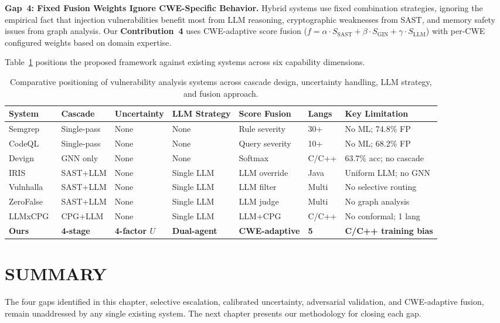 \textbf{Gap~4: Fixed Fusion Weights Ignore CWE-Specific Behavior.}
Hybrid systems use fixed combination strategies, ignoring the empirical
fact that injection vulnerabilities benefit most from LLM reasoning,
cryptographic weaknesses from SAST, and memory safety issues from graph
analysis. Our \textbf{Contribution~4} uses CWE-adaptive score fusion
($f = \alpha \cdot S_{\text{SAST}} + \beta \cdot S_{\text{GIN}} +
\gamma \cdot S_{\text{LLM}}$) with per-CWE configured weights based on domain expertise.

Table~\ref{tab:gap-positioning} positions the proposed framework against
existing systems across six capability dimensions.

\begin{table}[H]
\centering
\caption{Comparative positioning of vulnerability analysis systems across cascade design, uncertainty handling, LLM strategy, and fusion approach.}
\label{tab:gap-positioning}
\small
\renewcommand{\arraystretch}{1.15}
\begin{tabular}{@{}p{1.6cm} p{1.3cm} p{1.3cm} p{1.4cm} p{1.4cm} p{1.0cm} p{2.2cm}@{}}
\toprule
\textbf{System} & \textbf{Cascade} & \textbf{Uncertainty} & \textbf{LLM Strategy} & \textbf{Score Fusion} & \textbf{Langs} & \textbf{Key Limitation} \\
\midrule
Semgrep~\cite{semgrep2024} & Single-pass & None & None & Rule severity & 30+ & No ML; 74.8\% FP \\
CodeQL~\cite{codeql2024} & Single-pass & None & None & Query severity & 10+ & No ML; 68.2\% FP \\
Devign~\cite{devign2019} & GNN only & None & None & Softmax & C/C++ & 63.7\% acc; no cascade \\
IRIS~\cite{iris2025} & SAST+LLM & None & Single LLM & LLM override & Java & Uniform LLM; no GNN \\
Vulnhalla~\cite{vulnhalla2025} & SAST+LLM & None & Single LLM & LLM filter & Multi & No selective routing \\
ZeroFalse~\cite{zerofalse2025} & SAST+LLM & None & Single LLM & LLM judge & Multi & No graph analysis \\
LLMxCPG~\cite{llmxcpg2025} & CPG+LLM & None & Single LLM & LLM+CPG & C/C++ & No conformal; 1 lang \\
\midrule
\textbf{Ours} & \textbf{4-stage} & \textbf{4-factor $U$} & \textbf{Dual-agent} & \textbf{CWE-adaptive} & \textbf{5} & \textbf{C/C++ training bias} \\
\bottomrule
\end{tabular}
\end{table}

\section{\uppercase{Summary}}
\label{sec:litsurvey-summary}

The four gaps identified in this chapter, selective escalation, calibrated uncertainty, adversarial validation, and CWE-adaptive fusion, remain unaddressed by any single existing system. The next chapter presents our methodology for closing each gap.

